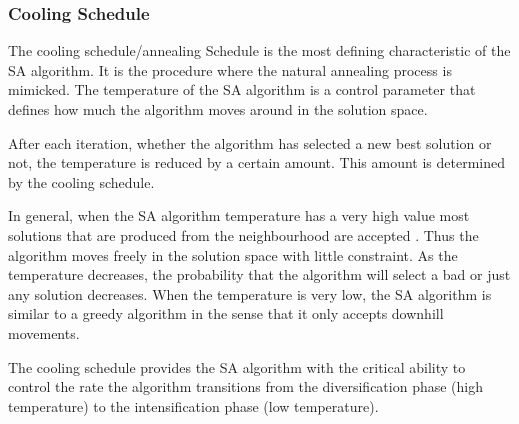 \subsubsection{Cooling Schedule}
The cooling schedule/annealing Schedule is the most defining characteristic of the \gls{SA} algorithm. It is the procedure where the natural annealing process is mimicked. The temperature of the \gls{SA} algorithm is a control parameter that defines how much the algorithm moves around in the solution space.

After each iteration, whether the algorithm has selected a new best solution or not, the temperature is reduced by a certain amount. This amount is determined by the cooling schedule.

In general, when the \gls{SA} algorithm temperature has a very high value most solutions that are produced from the neighbourhood are accepted \cite{ClusterSA}. Thus the algorithm moves freely in the solution space with little constraint. As the temperature decreases, the probability that the algorithm will select a bad or just any solution decreases. When the temperature is very low, the \gls{SA} algorithm is similar to a greedy algorithm in the sense that it only accepts downhill movements\cite{ClusterSA}.

The cooling schedule provides the \gls{SA} algorithm with the critical ability to control the rate the algorithm transitions from the diversification phase (high temperature) to the intensification phase (low temperature).

